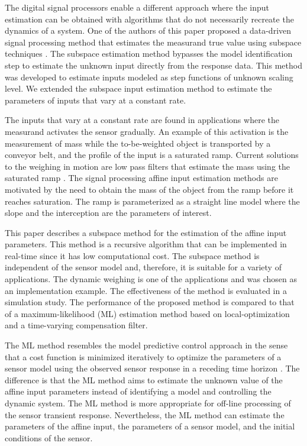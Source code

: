 The digital signal processors enable a different approach where the input estimation can be obtained with algorithms that do not necessarily recreate the dynamics of a system.
One of the authors of this paper proposed a data-driven signal processing method that estimates the measurand true value using subspace techniques \cite{Markovsky15cep, Markovsky15ieee}.
The subspace estimation method bypasses the model identification step to estimate the unknown input directly from the response data.
This method was developed to estimate inputs modeled as step functions of unknown scaling level.
We extended the subspace input estimation method to estimate the parameters of inputs that vary at a constant rate.

The inputs that vary at a constant rate are found in applications where the measurand activates the sensor gradually. 
An example of this activation is the measurement of mass while the to-be-weighted object is transported by a conveyor belt, and the profile of the input is a saturated ramp.
Current solutions to the weighing in motion are low pass filters that estimate the mass using the saturated ramp \cite{Tasaki07, Pietrzak14}.
The signal processing affine input estimation methods are motivated by the need to obtain the mass of the object from the ramp before it reaches saturation.
The ramp is parameterized as a straight line model where the slope and the interception are the parameters of interest.

This paper describes a subspace method for the estimation of the affine input parameters.
This method is a recursive algorithm that can be implemented in real-time since it has low computational cost.
The subspace method is independent of the sensor model and, therefore, it is suitable for a variety of applications.
The dynamic weighing is one of the applications and was chosen as an implementation example.
The effectiveness of the method is evaluated in a simulation study.
The performance of the proposed method is compared to that of a maximum-likelihood (ML) estimation method based on local-optimization and a time-varying compensation filter.

The ML method resembles the model predictive control approach in the sense that a cost function is minimized iteratively to optimize the parameters of a sensor model using the observed sensor response in a receding time horizon \cite{Mayne14}.
The difference is that the ML method aims to estimate the unknown value of the affine input parameters instead of identifying a model and controlling the dynamic system.
The ML method is more appropriate for off-line processing of the sensor transient response.
Nevertheless, the ML method can estimate the parameters of the affine input, the parameters of a sensor model, and the initial conditions of the sensor.

